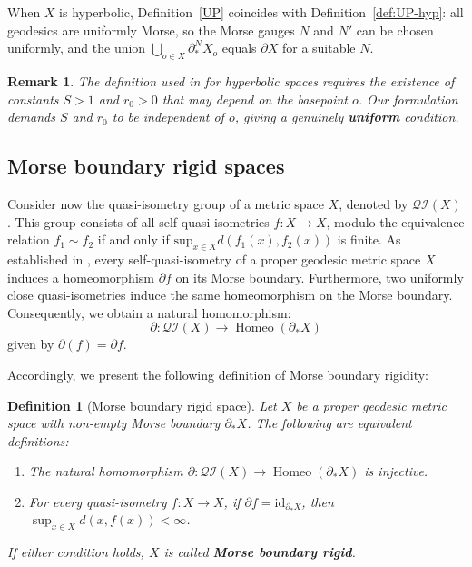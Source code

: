 \documentclass[a4paper,11pt,oneside]{article}
\newtheorem{Definition}[Theorem]{Definition}
\newtheorem{Remark}[Theorem]{Remark}
\begin{document}
When $X$ is hyperbolic, Definition~\ref{UP} coincides with Definition~\ref{def:UP-hyp}: 
all geodesics are uniformly Morse, so the Morse gauges $N$ and $N'$ can be chosen uniformly, and the union $\bigcup_{o\in X}\partial_*^NX_o$ equals $\partial X$ for a suitable $N$.

\begin{Remark}
The definition used in \cite{LiangZhou24} for hyperbolic spaces requires the existence of constants $S>1$ and $r_0>0$ that may depend on the basepoint $o$. Our formulation demands $S$ and $r_0$ to be independent of $o$, giving a genuinely \textbf{uniform} condition. 
\end{Remark}

\subsection{Morse boundary rigid spaces}

Consider now the quasi-isometry group of a metric space $X$, denoted by $\mathcal{QI}(X)$.
This group consists of all self-quasi-isometries $f:X\to X$, modulo the equivalence relation $f_1\sim f_2$ if and only if $\mathrm{sup}_{x\in X}d(f_1(x),f_2(x))$ is finite. 
As established in \cite{CharneySultan15, Cordes17}, every self-quasi-isometry of a proper geodesic metric space $X$ induces a homeomorphism $\partial f$ on its Morse boundary. Furthermore, two uniformly close quasi-isometries induce the same homeomorphism on the Morse boundary. 
Consequently, we obtain a natural homomorphism:
\[\partial:\mathcal{QI}(X)\to \operatorname{Homeo}(\partial_*X) 
\] given by $\partial(f)=\partial f$.

Accordingly, we present the following definition of Morse boundary rigidity:

\begin{Definition}[Morse boundary rigid space]\label{MBR}
Let $X$ be a proper geodesic metric space with non-empty Morse boundary $\partial_*X$.
The following are equivalent definitions:
\begin{enumerate}
\item The natural homomorphism $\partial:\mathcal{QI}(X)\to \operatorname{Homeo}(\partial_*X)$ is injective.
\item For every quasi-isometry $f:X \to X$, if $\partial f=\text{id}_{\partial_*X}$, then $\sup_{x\in X} d(x,f(x))<\infty$.
\end{enumerate}
If either condition holds, $X$ is called \textbf{Morse boundary rigid}.
\end{Definition}
\end{document}
